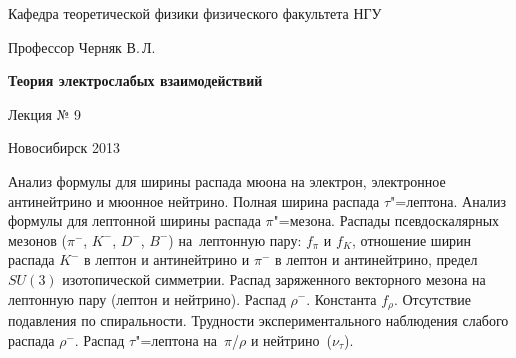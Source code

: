 \documentclass[12pt,pagesize,paper=192mm:108mm]{scrbook}
\begin{document}
\begin{titlepage}
\begin{center}
    Кафедра теоретической физики физического факультета НГУ
    \medskip

    \Large
    Профессор Черняк В.\,Л.
    \bigskip

    \huge
    \textbf{Теория электрослабых взаимодействий}
    \bigskip

    \Large
    Лекция № 9
    \vfill

    \vfill

\normalsize    Новосибирск 2013
  \smallskip

  \ccbysa
  \end{center}
\end{titlepage}
\newpage

\vspace*{-1em}
\begin{center}
 \vfill
  \begin{minipage}{0.66\linewidth}
    Анализ формулы для ширины распада мюона на электрон, электронное
    антинейтрино и мюонное нейтрино. Полная ширина распада
    $\tau$"=лептона.  Анализ формулы для лептонной ширины распада
    $\pi$"=мезона. Распады псевдоскалярных мезонов ($\pi^-$, $K^-$,
    $D^-$, $B^-$) на~лептонную пару: $f_{\pi}$ и $f_K$, отношение
    ширин распада $K^-$ в лептон и антинейтрино и $\pi^-$ в лептон и
    антинейтрино, предел $SU(3)$ изотопической симметрии. Распад
    заряженного векторного мезона на лептонную пару (лептон и
    нейтрино).  Распад $\rho^-$. Константа $f_{\rho}$. Отсутствие
    подавления по спиральности.  Трудности экспериментального
    наблюдения слабого распада $\rho^-$. Распад $\tau$"=лептона
    на~$\pi$/$\rho$ и нейтрино~($\nu_{\tau}$).
  \end{minipage}
  \vfill

\end{center}
\end{document}
